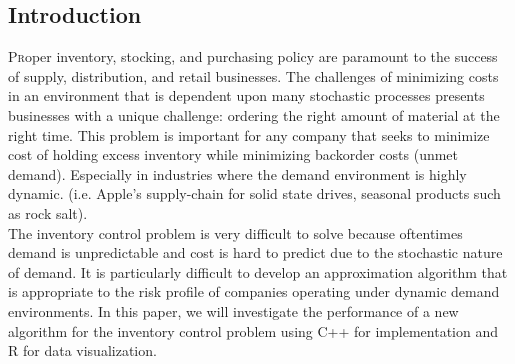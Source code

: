 \documentclass[twoside]{article}
\begin{document}
\begin{multicols}{2} %

\section{Introduction}

\lettrine[nindent=0em,lines=2]{P}roper inventory, stocking, and purchasing policy are paramount to the success of supply, distribution, and retail businesses. The challenges of minimizing costs in an environment that is dependent upon many stochastic processes presents businesses with a unique challenge: ordering the right amount of material at the right time. This problem is important for any company that seeks to minimize cost of holding excess inventory while minimizing backorder costs (unmet demand). Especially in industries where the demand environment is highly dynamic. (i.e. Apple's supply-chain for solid state drives, seasonal products such as rock salt). \\
The inventory control problem is very difficult to solve because oftentimes demand is unpredictable and cost is hard to predict due to the stochastic nature of demand. It is particularly difficult to develop an approximation algorithm that is appropriate to the risk profile of companies operating under dynamic demand environments. In this paper, we will investigate the performance of a new algorithm\cite{CLAcha2} for the inventory control problem using C++ for implementation and R for data visualization.\\



\end{multicols}
\end{document}
